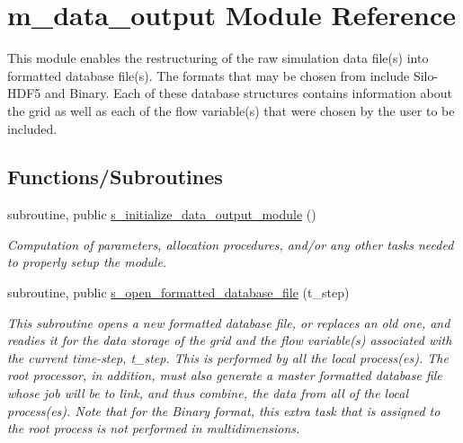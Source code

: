 \hypertarget{namespacem__data__output}{}\section{m\+\_\+data\+\_\+output Module Reference}
\label{namespacem__data__output}


This module enables the restructuring of the raw simulation data file(s) into formatted database file(s). The formats that may be chosen from include Silo-\/\+H\+D\+F5 and Binary. Each of these database structures contains information about the grid as well as each of the flow variable(s) that were chosen by the user to be included.  


\subsection*{Functions/\+Subroutines}
\begin{DoxyCompactItemize}
\item 
subroutine, public \hyperlink{namespacem__data__output_ab65b312ef83adb104cafafada9c998b6}{s\+\_\+initialize\+\_\+data\+\_\+output\+\_\+module} ()
\begin{DoxyCompactList}\small\item\em Computation of parameters, allocation procedures, and/or any other tasks needed to properly setup the module. \end{DoxyCompactList}\item 
subroutine, public \hyperlink{namespacem__data__output_ae767b4364e76ee05872868171fd2f05d}{s\+\_\+open\+\_\+formatted\+\_\+database\+\_\+file} (t\+\_\+step)
\begin{DoxyCompactList}\small\item\em This subroutine opens a new formatted database file, or replaces an old one, and readies it for the data storage of the grid and the flow variable(s) associated with the current time-\/step, t\+\_\+step. This is performed by all the local process(es). The root processor, in addition, must also generate a master formatted database file whose job will be to link, and thus combine, the data from all of the local process(es). Note that for the Binary format, this extra task that is assigned to the root process is not performed in multidimensions. \end{DoxyCompactList}\end{DoxyCompactItemize}
\textbf{ }\par
